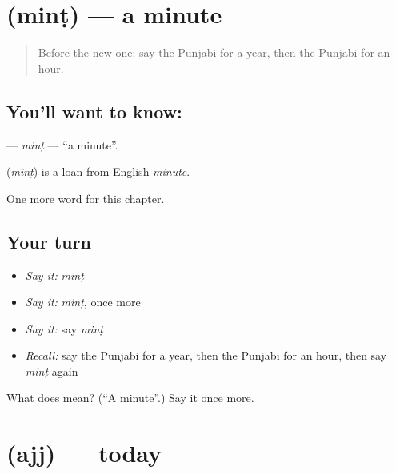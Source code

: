 \section[\texorpdfstring{\pa{ਮਿੰਟ} (minṭ)}{ਮਿੰਟ (minṭ)}]{ (minṭ) — a minute}

\label{lesson:PA-C86-mint}



\begin{quote}
Before the new one: say the Punjabi for a year, then the Punjabi for an hour.
\end{quote}

\subsection*{You'll want to know: }
\textbf{} — \emph{minṭ} — \textquotedblleft{}a minute\textquotedblright{}.

\begin{cousinweb}
\textbf{} (\emph{minṭ}) is a loan from English \emph{minute}.
\end{cousinweb}

\begin{grammarlens}[title={What you've built}]
One more word for this chapter.
\end{grammarlens}

\subsection*{Your turn}
\begin{itemize}
\raggedright
  \item \emph{Say it:} \emph{minṭ}
  \item \emph{Say it:} \emph{minṭ}, once more
  \item \emph{Say it:} say \emph{minṭ}
  \item \emph{Recall:} say the Punjabi for a year, then the Punjabi for an hour, then say \emph{minṭ} again
\end{itemize}

\begin{tcolorbox}[breakable,colback=teal!4,colframe=teal!35!black,title={Before you move on}]
What does  mean? (\textquotedblleft{}A minute\textquotedblright{}.) Say it once more.
\end{tcolorbox}
\section[\texorpdfstring{\pa{ਅੱਜ} (ajj)}{ਅੱਜ (ajj)}]{ (ajj) — today}


